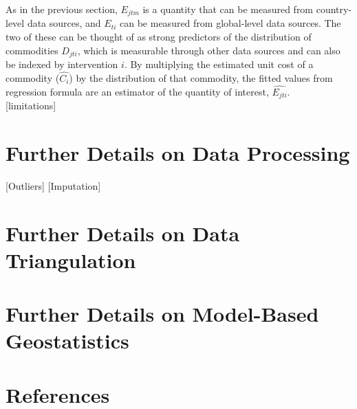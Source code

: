 \documentclass[twocolumn]{bmcart}%
\begin{document}
As in the previous section, $E_{jtm}$ is a quantity that can be measured from country-level data sources, and $E_{ti}$ can be measured from global-level data sources. The two of these can be thought of as strong predictors of the distribution of commodities $D_{jti}$, which is measurable through other data sources and can also be indexed by intervention $i$. By multiplying the estimated unit cost of a commodity ($\widehat{C_i}$) by the distribution of that commodity, the fitted values from regression formula are an estimator of the quantity of interest, $\widehat{E_{jti}}$. \\

[limitations] \\

\section{Further Details on Data Processing} \label{data_processing}

[Outliers]
[Imputation]




\section{Further Details on Data Triangulation} \label{triangulation}



\section{Further Details on Model-Based Geostatistics} \label{mbg}



\section{References}
\end{document}
